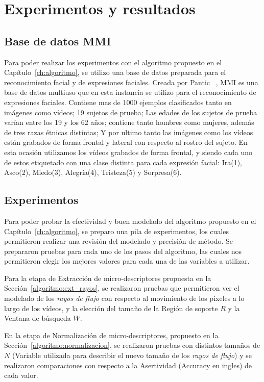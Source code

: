 \chapter[Experimentos y resultados]{Experimentos y resultados}
\label{ch:exp_result}

\section{Base de datos MMI}
\label{exp:bdd}
Para poder realizar los experimentos con el algoritmo propuesto en el Capítulo~\ref{ch:algoritmo}, se utilizo una base de datos preparada para el reconocimiento facial y de expresiones faciales. Creada por Pantic \etal~\cite{Pantic2005}, MMI es una base de datos multiuso que en esta instancia se utilizo para el reconocimiento de expresiones faciales. Contiene mas de 1000 ejemplos clasificados tanto en imágenes como vídeos; 19 sujetos de prueba; Las edades de los sujetos de prueba varían entre los 19 y los 62 años;  contiene tanto hombres como mujeres, además de tres razas étnicas distintas; Y por ultimo tanto las imágenes como los vídeos están grabados de forma frontal y lateral con respecto al rostro del sujeto. En esta ocasión utilizamos los vídeos grabados de forma frontal, y siendo cada uno de estos etiquetado con una clase distinta para cada expresión facial: Ira(1), Asco(2), Miedo(3), Alegría(4), Tristeza(5) y Sorpresa(6).

\section{Experimentos}
\label{exp:exp}

Para poder probar la efectividad y buen modelado del algoritmo propuesto en el Capítulo~\ref{ch:algoritmo}, se preparo una pila de experimentos, los cuales permitieron realizar una revisión del modelado y precisión de método.
Se prepararon pruebas para cada uno de los pasos del algoritmo, las cuales nos permitieron elegir los mejores valores para cada una de las variables a utilizar.

Para la etapa de Extracción de micro-descriptores propuesta en la Sección~\ref{algoritmo:ext_rayos}, se realizaron pruebas que permitieron ver el modelado de los \textit{rayos de flujo} con respecto al movimiento de los pixeles a lo largo de los vídeos, y la elección del tamaño de la Región de soporte $R$ y la Ventana de búsqueda $W$.

En la etapa de Normalización de micro-descriptores, propuesto en la Sección~\ref{algoritmo:normalizacion}, se realizaron pruebas con distintos tamaños de $N$ (Variable utilizada para describir el nuevo tamaño de los \textit{rayos de flujo}) y se realizaron comparaciones con respecto a la Asertividad (Accuracy en ingles) de cada valor.

